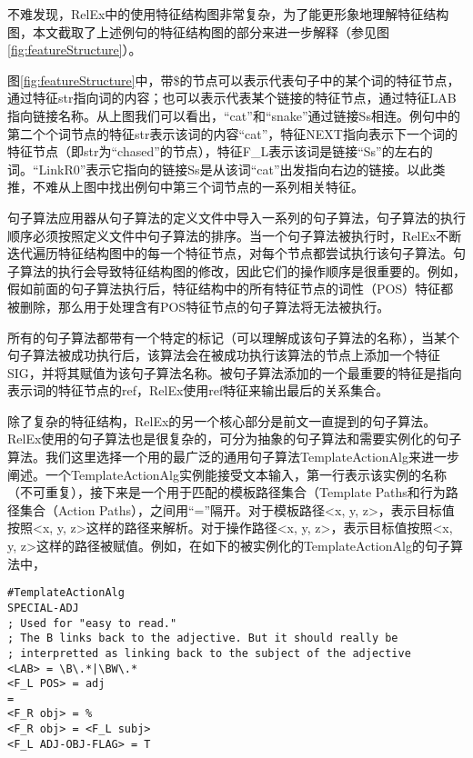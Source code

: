 不难发现，RelEx中的使用特征结构图非常复杂，为了能更形象地理解特征结构图，本文截取了上述例句的特征结构图的部分来进一步解释（参见图\ref{fig:featureStructure}）。
 
  图\ref{fig:featureStructure}中，带\$的节点可以表示代表句子中的某个词的特征节点，通过特征str指向词的内容；也可以表示代表某个链接的特征节点，通过特征LAB指向链接名称。从上图我们可以看出，“cat”和“snake”通过链接Ss相连。例句中的第二个个词节点的特征str表示该词的内容“cat”，特征NEXT指向表示下一个词的特征节点（即str为“chased”的节点），特征F\_L表示该词是链接“Ss”的左右的词。“LinkR0”表示它指向的链接Ss是从该词“cat”出发指向右边的链接。以此类推，不难从上图中找出例句中第三个词节点的一系列相关特征。


句子算法应用器从句子算法的定义文件中导入一系列的句子算法，句子算法的执行顺序必须按照定义文件中句子算法的排序。当一个句子算法被执行时，RelEx不断迭代遍历特征结构图中的每一个特征节点，对每个节点都尝试执行该句子算法。句子算法的执行会导致特征结构图的修改，因此它们的操作顺序是很重要的。例如，假如前面的句子算法执行后，特征结构中的所有特征节点的词性（POS）特征都被删除，那么用于处理含有POS特征节点的句子算法将无法被执行。

所有的句子算法都带有一个特定的标记（可以理解成该句子算法的名称），当某个句子算法被成功执行后，该算法会在被成功执行该算法的节点上添加一个特征SIG，并将其赋值为该句子算法名称。被句子算法添加的一个最重要的特征是指向表示词的特征节点的ref，RelEx使用ref特征来输出最后的关系集合。

除了复杂的特征结构，RelEx的另一个核心部分是前文一直提到的句子算法。RelEx使用的句子算法也是很复杂的，可分为抽象的句子算法和需要实例化的句子算法。我们这里选择一个用的最广泛的通用句子算法TemplateActionAlg来进一步阐述。一个TemplateActionAlg实例能接受文本输入，第一行表示该实例的名称（不可重复），接下来是一个用于匹配的模板路径集合（Template Paths和行为路径集合（Action Paths），之间用“=”隔开。对于模板路径\textless x, y, z\textgreater ，表示目标值按照\textless x, y, z\textgreater 这样的路径来解析。对于操作路径\textless x, y, z\textgreater ，表示目标值按照\textless x, y, z\textgreater 这样的路径被赋值。例如，在如下的被实例化的TemplateActionAlg的句子算法中，

\begin{verbatim}
#TemplateActionAlg
SPECIAL-ADJ
; Used for "easy to read." 
; The B links back to the adjective. But it should really be
; interpretted as linking back to the subject of the adjective
<LAB> = \B\.*|\BW\.*
<F_L POS> = adj
=
<F_R obj> = %
<F_R obj> = <F_L subj>
<F_L ADJ-OBJ-FLAG> = T
\end{verbatim}

